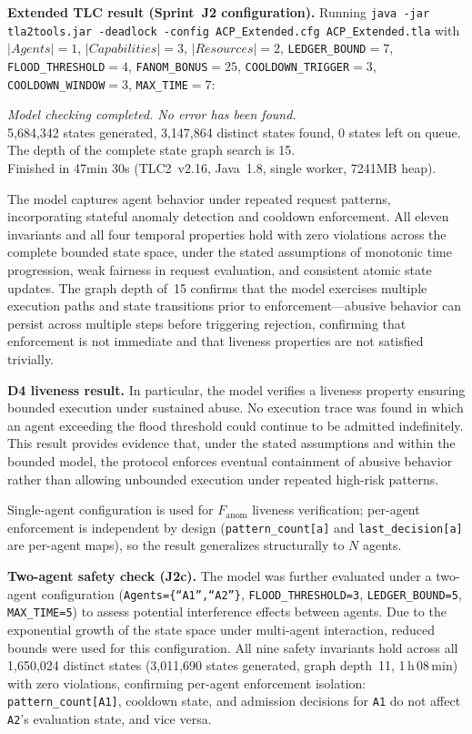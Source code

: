 \documentclass[11pt]{article}
\theoremstyle{definition}
\begin{document}
\noindent\textbf{Extended TLC result (Sprint~J2 configuration).}
Running \texttt{java -jar tla2tools.jar -deadlock -config ACP\_Extended.cfg ACP\_Extended.tla}
with $|\mathit{Agents}|=1$, $|\mathit{Capabilities}|=3$, $|\mathit{Resources}|=2$,
\texttt{LEDGER\_BOUND}$=7$, \texttt{FLOOD\_THRESHOLD}$=4$, \texttt{FANOM\_BONUS}$=25$,
\texttt{COOLDOWN\_TRIGGER}$=3$, \texttt{COOLDOWN\_WINDOW}$=3$, \texttt{MAX\_TIME}$=7$:

\smallskip
\noindent\textit{Model checking completed. No error has been found.}\\
5,684,342 states generated, 3,147,864 distinct states found, 0 states left on queue.\\
The depth of the complete state graph search is 15.\\
Finished in 47min 30s (TLC2~v2.16, Java~1.8, single worker, 7241MB heap).

\smallskip
The model captures agent behavior under repeated request patterns, incorporating
stateful anomaly detection and cooldown enforcement.
All eleven invariants and all four temporal properties hold with zero violations across
the complete bounded state space, under the stated assumptions of monotonic time
progression, weak fairness in request evaluation, and consistent atomic state updates.
The graph depth of~15 confirms that the model exercises multiple execution paths and
state transitions prior to enforcement---abusive behavior can persist across multiple
steps before triggering rejection, confirming that enforcement is not immediate and
that liveness properties are not satisfied trivially.

\smallskip
\noindent\textbf{D4 liveness result.}
In particular, the model verifies a liveness property ensuring bounded execution under
sustained abuse.
No execution trace was found in which an agent exceeding the flood threshold could
continue to be admitted indefinitely.
This result provides evidence that, under the stated assumptions and within the bounded
model, the protocol enforces eventual containment of abusive behavior rather than
allowing unbounded execution under repeated high-risk patterns.

\smallskip
Single-agent configuration is used for $F_{\text{anom}}$ liveness verification;
per-agent enforcement is independent by design (\texttt{pattern\_count[a]} and
\texttt{last\_decision[a]} are per-agent maps), so the result generalizes structurally to $N$ agents.

\smallskip
\noindent\textbf{Two-agent safety check (J2c).}
The model was further evaluated under a two-agent configuration
(\texttt{Agents=\{``A1'',``A2''\}}, \texttt{FLOOD\_THRESHOLD=3},
\texttt{LEDGER\_BOUND=5}, \texttt{MAX\_TIME=5}) to assess potential
interference effects between agents.
Due to the exponential growth of the state space under multi-agent interaction,
reduced bounds were used for this configuration.
All nine safety invariants hold across all 1,650,024 distinct states
(3,011,690 states generated, graph depth~11, 1\,h\,08\,min) with zero violations,
confirming per-agent enforcement isolation:
\texttt{pattern\_count[A1]}, cooldown state, and admission decisions for \texttt{A1}
do not affect \texttt{A2}'s evaluation state, and vice versa.
\end{document}

